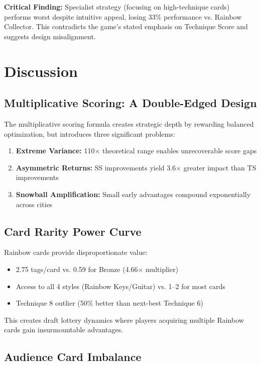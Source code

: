\documentclass[11pt,a4paper]{article}
\begin{document}
\textbf{Critical Finding:} Specialist strategy (focusing on high-technique cards) performs worst despite intuitive appeal, losing 33\% performance vs. Rainbow Collector. This contradicts the game's stated emphasis on Technique Score and suggests design misalignment.

\section{Discussion}

\subsection{Multiplicative Scoring: A Double-Edged Design}

The multiplicative scoring formula creates strategic depth by rewarding balanced optimization, but introduces three significant problems:

\begin{enumerate}
    \item \textbf{Extreme Variance:} 110$\times$ theoretical range enables unrecoverable score gaps
    \item \textbf{Asymmetric Returns:} SS improvements yield 3.6$\times$ greater impact than TS improvements
    \item \textbf{Snowball Amplification:} Small early advantages compound exponentially across cities
\end{enumerate}

\subsection{Card Rarity Power Curve}

Rainbow cards provide disproportionate value:
\begin{itemize}
    \item 2.75 tags/card vs. 0.59 for Bronze (4.66$\times$ multiplier)
    \item Access to all 4 styles (Rainbow Keys/Guitar) vs. 1--2 for most cards
    \item Technique 8 outlier (50\% better than next-best Technique 6)
\end{itemize}

This creates draft lottery dynamics where players acquiring multiple Rainbow cards gain insurmountable advantages.

\subsection{Audience Card Imbalance}
\end{document}
